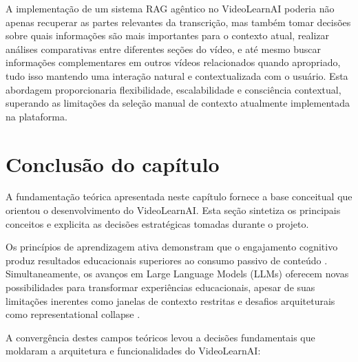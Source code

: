 \documentclass[tcc,capa]{texufpel}
\begin{document}
A implementação de um sistema RAG agêntico no VideoLearnAI poderia não apenas recuperar as partes relevantes da transcrição, mas também tomar decisões sobre quais informações são mais importantes para o contexto atual, realizar análises comparativas entre diferentes seções do vídeo, e até mesmo buscar informações complementares em outros vídeos relacionados quando apropriado, tudo isso mantendo uma interação natural e contextualizada com o usuário. Esta abordagem proporcionaria flexibilidade, escalabilidade e consciência contextual, superando as limitações da seleção manual de contexto atualmente implementada na plataforma.


\section{Conclusão do capítulo}

A fundamentação teórica apresentada neste capítulo fornece a base conceitual que orientou o desenvolvimento do VideoLearnAI. Esta seção sintetiza os principais conceitos e explicita as decisões estratégicas tomadas durante o projeto.

Os princípios de aprendizagem ativa demonstram que o engajamento cognitivo produz resultados educacionais superiores ao consumo passivo de conteúdo \cite{freeman2014active}. Simultaneamente, os avanços em Large Language Models (LLMs) oferecem novas possibilidades para transformar experiências educacionais, apesar de suas limitações inerentes como janelas de contexto restritas \cite{liu2023lost} e desafios arquiteturais como representational collapse \cite{barbero2024transformers}.

A convergência destes campos teóricos levou a decisões fundamentais que moldaram a arquitetura e funcionalidades do VideoLearnAI:
\end{document}
